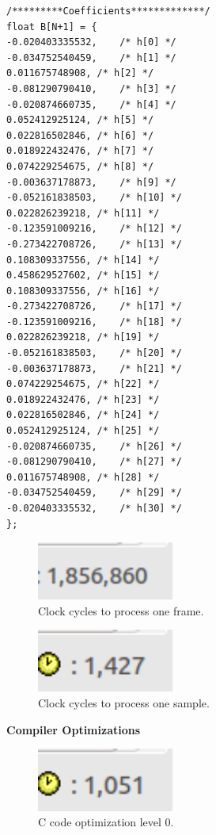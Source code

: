 \documentclass{article}
\begin{document}
\begin{verbatim}
/*********Coefficients*************/
float B[N+1] = {
-0.020403335532,	/* h[0] */
-0.034752540459,	/* h[1] */
0.011675748908,	/* h[2] */
-0.081290790410,	/* h[3] */
-0.020874660735,	/* h[4] */
0.052412925124,	/* h[5] */
0.022816502846,	/* h[6] */
0.018922432476,	/* h[7] */
0.074229254675,	/* h[8] */
-0.003637178873,	/* h[9] */
-0.052161838503,	/* h[10] */
0.022826239218,	/* h[11] */
-0.123591009216,	/* h[12] */
-0.273422708726,	/* h[13] */
0.108309337556,	/* h[14] */
0.458629527602,	/* h[15] */
0.108309337556,	/* h[16] */
-0.273422708726,	/* h[17] */
-0.123591009216,	/* h[18] */
0.022826239218,	/* h[19] */
-0.052161838503,	/* h[20] */
-0.003637178873,	/* h[21] */
0.074229254675,	/* h[22] */
0.018922432476,	/* h[23] */
0.022816502846,	/* h[24] */
0.052412925124,	/* h[25] */
-0.020874660735,	/* h[26] */
-0.081290790410,	/* h[27] */
0.011675748908,	/* h[28] */
-0.034752540459,	/* h[29] */
-0.020403335532,	/* h[30] */
};
\end{verbatim}

\begin{figure}[h]
  \begin{center}
    \includegraphics[width=0.4\textwidth]{img/frame_clock.png}
    \caption{Clock cycles to process one frame.}
  \end{center}
\end{figure}

\begin{figure}[h]
  \begin{center}
    \includegraphics[width=0.4\textwidth]{img/circular_buffer.png}
    \caption{Clock cycles to process one sample.}
  \end{center}
\end{figure}

\pagebreak
\textbf{Compiler Optimizations}

\begin{figure}[h!]
  \begin{center}
    \includegraphics[width=0.4\textwidth]{img/c_opt_0.png}
    \caption{C code optimization level 0.}
  \end{center}
\end{figure}
\end{document}
